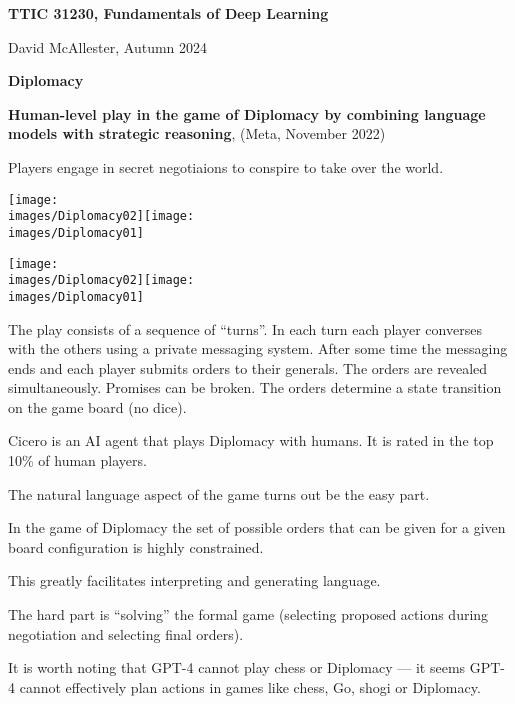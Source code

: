 




{\Huge

  \centerline{\bf TTIC 31230, Fundamentals of Deep Learning}
  \bigskip
  \centerline{David McAllester, Autumn 2024}


  \vfill
  \centerline{\bf Diplomacy}
  \vfill
  \vfill


{\bf Human-level play in the game of Diplomacy by combining language models with strategic reasoning}, (Meta, November 2022)

\vfill
Players engage in secret negotiaions to conspire to take over the world.

\vfill
\centerline{\texttt{[image: \\images/Diplomacy02]}\hfill\texttt{[image: \\images/Diplomacy01]}}


\vfill
\centerline{\texttt{[image: \\images/Diplomacy02]}\hspace{4em}\texttt{[image: \\images/Diplomacy01]}}

\vfill
The play consists of a sequence of ``turns''.  In each turn each player converses with the others using a private messaging system.  After some time the messaging ends and each player submits orders to their generals.  The orders are revealed simultaneously. Promises can be broken.  The orders determine a state transition on the game board (no dice).



Cicero is an AI agent that plays Diplomacy with humans.  It is rated in the top 10\% of human players.


The natural language aspect of the game turns out be the easy part.

\vfill
In the game of Diplomacy the set of possible orders that can be given for a given board configuration is highly constrained.

\vfill
This greatly facilitates interpreting and generating language.

\vfill
The hard part is ``solving'' the formal game (selecting proposed actions during negotiation and selecting final orders).


It is worth noting that GPT-4 cannot play chess or Diplomacy --- it seems GPT-4 cannot effectively plan actions in games
like chess, Go, shogi or Diplomacy.

}
